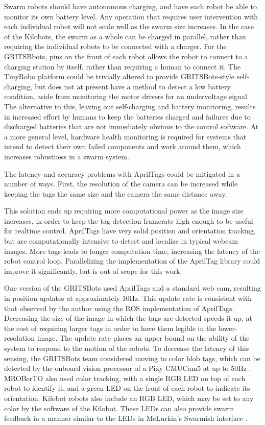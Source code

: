Swarm robots should have autonomous charging, and have each robot be able to monitor its own battery level. 
Any operation that requires user intervention with each individual robot will not scale well as the swarm size increases. 
In the case of the Kilobots, the swarm as a whole can be charged in parallel, rather than requiring the individual robots to be connected with a charger. 
For the GRITSBbots, pins on the front of each robot allows the robot to connect to a charging station by itself, rather than requiring a human to connect it. 
The TinyRobo platform could be trivially altered to provide GRITSBots-style self-charging, but does not at present have a method to detect a low battery condition, aside from monitoring the motor drivers for an undervoltage signal. 
The alternative to this, leaving out self-charging and battery monitoring, results in increased effort by humans to keep the batteries charged and failures due to discharged batteries that are not immediately obvious to the control software. 
At a more general level, hardware health monitoring is required for systems that intend to detect their own failed components and work around them, which increases robustness in a swarm system. 

The latency and accuracy problems with AprilTags could be mitigated in a number of ways. 
First, the resolution of the camera can be increased while keeping the tags the same size and the camera the same distance away. 

This solution ends up requiring more computational power as the image size increases, in order to keep the tag detection framerate high enough to be useful for realtime control. 
AprilTags have very solid position and orientation tracking, but are computationally intensive to detect and localize in typical webcam images. 
More tags leads to longer computation time, increasing the latency of the robot control loop. 
Parallelizing the implementation of the AprilTag library could improve it significantly, but is out of scope for this work. 

One version of the GRITSBots used AprilTags and a standard web cam, resulting in position updates at approximately 10Hz. 
This update rate is consistent with that observed by the author using the ROS implementation of AprilTags. 
Decreasing the size of the image in which the tags are detected speeds it up, at the cost of requiring larger tags in order to have them legible in the lower-resolution image. 
The update rate places an upper bound on the ability of the system to respond to the motion of the robots. 
To decrease the latency of this sensing, the GRITSBots team considered moving to color blob tags, which can be detected by the onboard vision processor of a Pixy CMUCam5 at up to 50Hz \cite{PickemGrits2014}. 
MROBerTO also used color tracking, with a single RGB LED on top of each robot to identify it, and a green LED on the front of each robot to indicate its orientation. 
Kilobot robots also include an RGB LED, which may be set to any color by the software of the Kilobot. 
These LEDs can also provide swarm feedback in a manner similar to the LEDs in McLurkin's Swarmish interface \cite{mclurkin2006speaking}.

